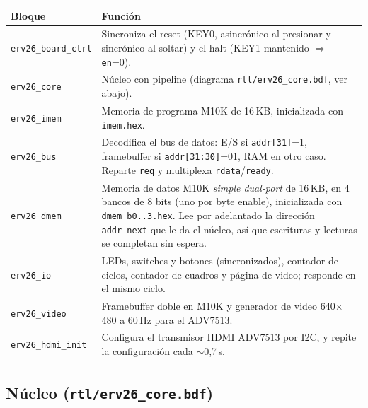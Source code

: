 \documentclass[11pt,a4paper]{article}
\newcommand{\code}[1]{\texttt{#1}}
\begin{document}
\begin{center}
\begin{tabularx}{\linewidth}{lL}
\toprule
Bloque & Función \\
\midrule
\code{erv26\_board\_ctrl} & Sincroniza el reset (KEY0, asincrónico al presionar y sincrónico al soltar) y el halt (KEY1 mantenido $\Rightarrow$ \code{en}=0). \\
\code{erv26\_core} & Núcleo con pipeline (diagrama \code{rtl/erv26\_core.bdf}, ver abajo). \\
\code{erv26\_imem} & Memoria de programa M10K de 16\,KB, inicializada con \code{imem.hex}. \\
\code{erv26\_bus} & Decodifica el bus de datos: E/S si \code{addr[31]}=1, framebuffer si \code{addr[31:30]}=01, RAM en otro caso. Reparte \code{req} y multiplexa \code{rdata}/\code{ready}. \\
\code{erv26\_dmem} & Memoria de datos M10K \emph{simple dual-port} de 16\,KB, en 4 bancos de 8 bits (uno por byte enable), inicializada con \code{dmem\_b0..3.hex}. Lee por adelantado la dirección \code{addr\_next} que le da el núcleo, así que escrituras y lecturas se completan sin espera. \\
\code{erv26\_io} & LEDs, switches y botones (sincronizados), contador de ciclos, contador de cuadros y página de video; responde en el mismo ciclo. \\
\code{erv26\_video} & Framebuffer doble en M10K y generador de video 640$\times$480 a 60\,Hz para el ADV7513. \\
\code{erv26\_hdmi\_init} & Configura el transmisor HDMI ADV7513 por I2C, y repite la configuración cada $\sim$0,7\,s. \\
\bottomrule
\end{tabularx}
\end{center}

\subsection{Núcleo (\code{rtl/erv26\_core.bdf})}
\end{document}
